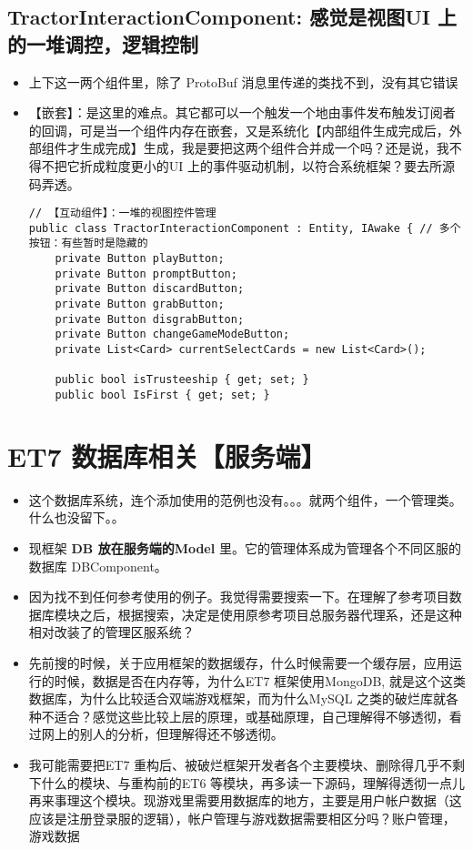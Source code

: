 \documentclass[9pt, b5paper]{article}
\begin{document}
\subsection{TractorInteractionComponent: 感觉是视图UI 上的一堆调控，逻辑控制}
\label{sec-3-8}
\begin{itemize}
\item 上下这一两个组件里，除了 ProtoBuf 消息里传递的类找不到，没有其它错误
\item 【嵌套】：是这里的难点。其它都可以一个触发一个地由事件发布触发订阅者的回调，可是当一个组件内存在嵌套，又是系统化【内部组件生成完成后，外部组件才生成完成】生成，我是要把这两个组件合并成一个吗？还是说，我不得不把它折成粒度更小的UI 上的事件驱动机制，以符合系统框架？要去所源码弄透。
\begin{verbatim}
// 【互动组件】：一堆的视图控件管理 
public class TractorInteractionComponent : Entity, IAwake { // 多个按钮：有些暂时是隐藏的
    private Button playButton;
    private Button promptButton;
    private Button discardButton;
    private Button grabButton;
    private Button disgrabButton;
    private Button changeGameModeButton;
    private List<Card> currentSelectCards = new List<Card>();

    public bool isTrusteeship { get; set; }
    public bool IsFirst { get; set; }
\end{verbatim}
\end{itemize}


\section{ET7 数据库相关【服务端】}
\label{sec-4}
\begin{itemize}
\item 这个数据库系统，连个添加使用的范例也没有。。。就两个组件，一个管理类。什么也没留下。。
\item 现框架 \textbf{DB 放在服务端的Model} 里。它的管理体系成为管理各个不同区服的数据库 DBComponent。
\item 因为找不到任何参考使用的例子。我觉得需要搜索一下。在理解了参考项目数据库模块之后，根据搜索，决定是使用原参考项目总服务器代理系，还是这种相对改装了的管理区服系统？
\item 先前搜的时候，关于应用框架的数据缓存，什么时候需要一个缓存层，应用运行的时候，数据是否在内存等，为什么ET7 框架使用MongoDB, 就是这个这类数据库，为什么比较适合双端游戏框架，而为什么MySQL 之类的破烂库就各种不适合？感觉这些比较上层的原理，或基础原理，自己理解得不够透彻，看过网上的别人的分析，但理解得还不够透彻。
\item 我可能需要把ET7 重构后、被破烂框架开发者各个主要模块、删除得几乎不剩下什么的模块、与重构前的ET6 等模块，再多读一下源码，理解得透彻一点儿再来事理这个模块。现游戏里需要用数据库的地方，主要是用户帐户数据（这应该是注册登录服的逻辑），帐户管理与游戏数据需要相区分吗？账户管理，游戏数据
\end{itemize}
\end{document}
